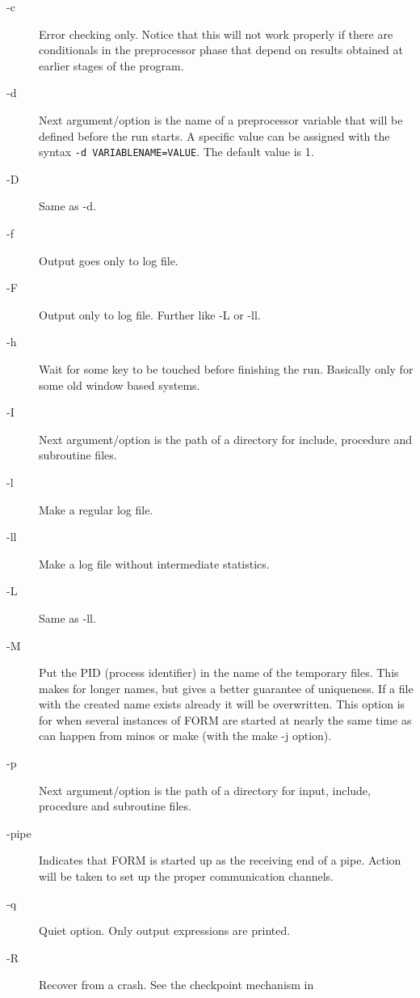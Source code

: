 \begin{description}
\item[-c] Error checking only. Notice that this will not work 
     properly if there are conditionals in the preprocessor phase that 
     depend on results obtained at earlier stages of the program.
\item[-d] Next argument/option is the name of a preprocessor 
     variable that will be defined before the run starts. A specific value can be assigned with the
	 syntax {\tt -d VARIABLENAME=VALUE}. The default value is 1.
\item[-D] Same as -d.
\item[-f] Output goes only to log file.
\item[-F] Output only to log file. Further like -L or -ll.
\item[-h] Wait for some key to be touched before finishing the run.
     Basically only for some old window based systems.
\item[-I] Next argument/option is the path of a directory for 
     include, procedure and subroutine files.
\item[-l] Make a regular log file.
\item[-ll] Make a log file without intermediate statistics.
\item[-L] Same as -ll.
\item[-M] Put the PID (process identifier) in the name of the temporary 
     files. This makes for longer names, but gives a better guarantee of 
     uniqueness. If a file with the created name exists already it will be 
     overwritten. This option is for when several instances of FORM are 
     started at nearly the same time as can happen from minos or make (with 
     the make -j option).
\item[-p] Next argument/option is the path of a directory for 
     input, include, procedure and subroutine files.
\item[-pipe] Indicates that FORM is started up as the receiving 
     end of a pipe. Action will be taken to set up the proper communication 
     channels.
\item[-q] Quiet option. Only output expressions are printed.
\item[-R] Recover from a crash. See the checkpoint mechanism in 

\end{description}
